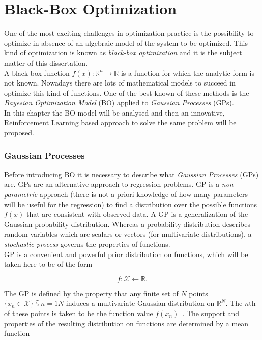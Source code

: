 \chapter{Black-Box Optimization}

One of the most exciting challenges in optimization practice is the possibility to optimize in absence of an algebraic model of the system to be optimized. This kind of optimization is known as \textit{black-box optimization} and it is the subject matter of this dissertation. \\

A black-box function $f(x) : \mathbb{R}^n \rightarrow \mathbb{R}$ is a function for which the analytic form is not known. Nowadays there are lots of mathematical models to succeed in optimize this kind of functions. One of the best known of these methods is the \textit{Bayesian Optimization Model} (BO) applied to \textit{Gaussian Processes} (GPs). \\

In this chapter the BO model will be analysed and then an innovative, Reinforcement Learning  based approach to solve the same problem will be proposed.

\subsection{Gaussian Processes} Before introducing BO it is necessary to describe what \textit{Gaussian Processes} (GPs) are. GPs are an alternative approach to regression problems. GP is a \textit{non-parametric} approach (there is not a priori knowledge of how many parameters will be useful for the regression) to find a distribution over the possible functions $f(x)$ that are consistent with observed data. A GP is a generalization of the Gaussian probability distribution. Whereas a probability distribution describes random variables which are scalars or vectors (for multivariate distributions), a \textit{stochastic process} governs the properties of functions. \\

GP is a convenient and powerful prior distribution on functions, which will be taken here to be of the form 

\begin{equation}
	f : \mathcal{X} \leftarrow \mathbb{R}.
\end{equation}

The GP is defined by the property that any finite set of $N$ points $\{x_n \in \mathcal{X}\}\subsup{}{ n=1}{N}$ induces a multivariate Gaussian distribution  on $\mathbb{R}^N$. The $n$th of these points is taken to be the function value $f(x_n)$~\cite{NIPS2012_4522}. The support and properties of the resulting distribution on functions are determined by a mean function 

